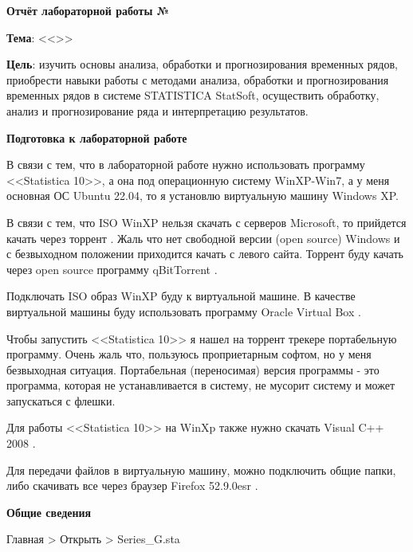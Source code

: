 \begin{center}
  \textbf{Отчёт лабораторной работы №\envReportLabNumber}
\end{center}

\textbf{Тема}:
<<\envReportTitle>>

\textbf{Цель}:
изучить основы анализа, обработки и прогнозирования временных рядов,
приобрести навыки работы с методами анализа,
обработки и прогнозирования временных рядов в системе STATISTICA StatSoft,
осуществить обработку, анализ и прогнозирование ряда и интерпретацию результатов.


\begin{center}
  \textbf{Подготовка к лабораторной работе}
\end{center}

В связи с тем, что в лабораторной работе нужно использовать программу <<Statistica 10>>,
а она под операционную систему WinXP-Win7,
а у меня основная ОС Ubuntu 22.04,
то я установлю виртуальную машину Windows XP.

В связи с тем, что ISO WinXP нельзя скачать с серверов Microsoft, то прийдется качать через торрент \cite{TorrentWinXP}.
Жаль что нет свободной версии (open source) Windows и с безвыходном положении приходится качать с левого сайта.
Торрент буду качать через open source программу qBitTorrent \cite{downloadQBitTorrent}.

Подключать ISO образ WinXP буду к виртуальной машине.
В качестве виртуальной машины буду использовать программу Oracle Virtual Box \cite{downloadVirtualBox}.

Чтобы запустить <<Statistica 10>> я нашел на торрент трекере портабельную программу. 
Очень жаль что, пользуюсь проприетарным софтом, но у меня безвыходная ситуация.
Портабельная (переносимая) версия программы - это программа, которая не устанавливается в систему, не мусорит систему
и может запускаться с флешки.

Для работы <<Statistica 10>> на WinXp также нужно скачать Visual C++ 2008 \cite{downloadVisualCpp2008}.

Для передачи файлов в виртуальную машину, можно подключить общие папки,
либо скачивать все через браузер Firefox 52.9.0esr \cite{downloadFirefox5290esr}.

\begin{center}
  \textbf{Общие сведения}
\end{center}

Главная > Открыть > Series\_G.sta

